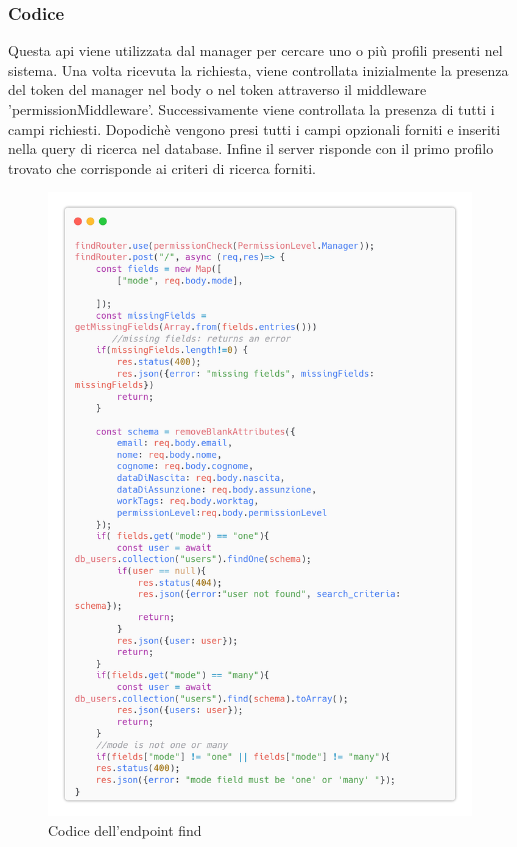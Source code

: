 \documentclass{report}
\begin{document}
\subsubsection*{Codice}
Questa api viene utilizzata dal manager per cercare uno o più  profili presenti nel sistema.
Una volta ricevuta la richiesta, viene controllata inizialmente la presenza del token del manager nel body o nel token attraverso il middleware 'permissionMiddleware'.
Successivamente viene controllata la presenza di tutti i campi richiesti.
Dopodichè vengono presi tutti i campi opzionali forniti e inseriti nella query di ricerca nel database.
Infine il server risponde con il primo profilo trovato che corrisponde ai criteri di ricerca forniti.
\begin{figure}[H]
	\centering\includegraphics[width=1\textwidth]{images/microservizio-dipendenti/find-carbon.png}
	\caption{Codice dell'endpoint find}
\end{figure}
\end{document}
